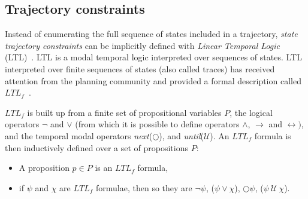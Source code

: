 \documentclass[3p,times]{elsarticle}
\begin{document}
\subsection{Trajectory constraints}
Instead of enumerating the full sequence of states included in a trajectory, {\em state trajectory constraints} can be implicitly defined with {\em Linear Temporal Logic} (LTL)~\cite{haslum:LTL:ecai10,bacchus:LTL:1998}. LTL is a modal temporal logic interpreted over sequences of states. LTL interpreted over finite sequences of states (also called traces) has received attention from the planning community and provided a formal description called $LTL_f$~\cite{Giacomo:LTLf:AAAI2014}.

$LTL_f$ is built up from a finite set of propositional variables $P$, the logical operators $\neg$ and $\vee$ (from which it is possible to define operators $\wedge$, $\rightarrow$ and $\leftrightarrow)$, and the temporal modal operators {\em next}($\bigcirc$), and {\em until}(${\mathcal U}$). An $LTL_f$ formula is then inductively defined over a set of propositions $P$:
\begin{itemize}
\item A proposition $p\in P$ is an $LTL_f$ formula,
\item if $\psi$ and $\chi$ are $LTL_f$ formulae, then so they are $\neg\psi$, ($\psi\vee\chi$), $\bigcirc\psi$, ($\psi\ {\mathcal U}\ \chi$).
\end{itemize}
\end{document}
